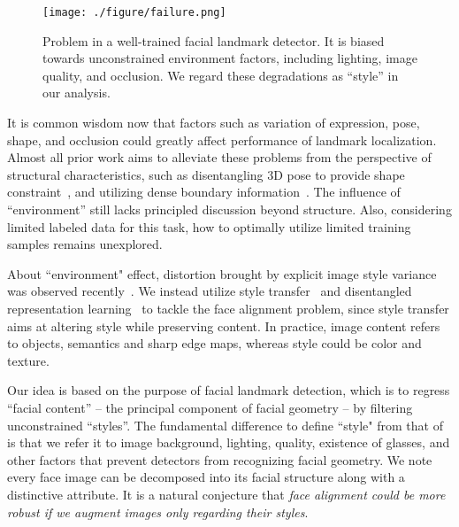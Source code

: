 \documentclass[10pt,twocolumn,letterpaper]{article}
\begin{document}
\begin{figure}[t]
\begin{center}
   \texttt{[image: ./figure/failure.png]}
\end{center}
\vspace{-0.5cm}
   \caption{{Problem in a well-trained facial landmark detector. It is biased towards unconstrained environment factors, including lighting, image quality, and occlusion. We regard these degradations as ``style'' in our analysis.  }}
\label{fig:backcase}
\end{figure}

It is common wisdom now that factors such as variation of expression, pose, shape, and occlusion could greatly affect performance of landmark localization. Almost all prior work aims to alleviate these problems from the perspective of structural characteristics, such as disentangling 3D pose to provide shape constraint~\cite{PCD-CNN}, and utilizing dense boundary information~\cite{LAB}. The influence of ``environment'' still lacks principled discussion beyond structure. Also, considering limited labeled data for this task, how to optimally utilize limited training samples remains unexplored. 

About ``environment" effect, distortion brought by explicit image style variance was observed recently~\cite{SAN}. We instead utilize style transfer~\cite{johnson2016perceptual,gatys2016image} and disentangled representation learning~\cite{tran2017disentangled,chen2016infogan, DRIT, vunet, bvae} to tackle the face alignment problem, since style transfer aims at altering style while preserving content. In practice, image content refers to objects, semantics and sharp edge maps, whereas style could be color and texture. 

Our idea is based on the purpose of facial landmark detection, which is to regress ``facial content'' -- the principal component of facial geometry -- by filtering unconstrained ``styles''. The fundamental difference to define ``style" from that of \cite{SAN} is that we refer it to image background, lighting, quality, existence of glasses, and other factors that prevent detectors from recognizing facial geometry. We note every face image can be decomposed into its facial structure along with a distinctive attribute. It is a natural conjecture that {\it face alignment could be more robust if we augment images only regarding their styles}.
\end{document}
